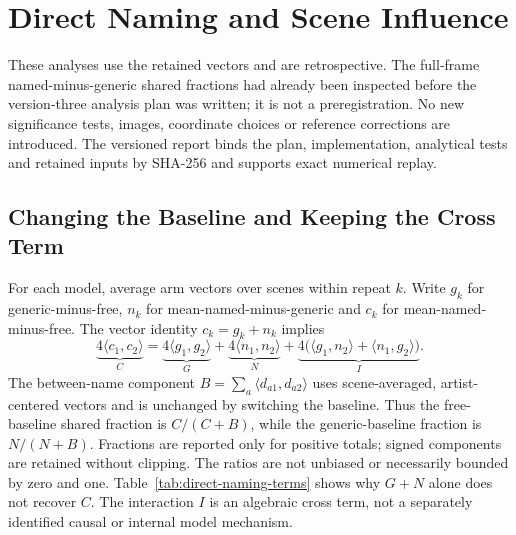 \section{Direct Naming and Scene Influence}\label{app:direct-naming}
These analyses use the retained vectors and are retrospective. The full-frame
named-minus-generic shared fractions had already been inspected before the
version-three analysis plan was written; it is not a preregistration.
No new significance tests, images, coordinate choices or reference corrections
are introduced. The versioned report binds the plan, implementation, analytical
tests and retained inputs by SHA-256 and supports exact numerical replay.

\subsection{Changing the Baseline and Keeping the Cross Term}
For each model, average arm vectors over scenes within repeat $k$. Write $g_k$
for generic-minus-free, $n_k$ for mean-named-minus-generic and $c_k$ for
mean-named-minus-free. The vector identity $c_k=g_k+n_k$ implies
\begin{equation}
 \underbrace{4\langle c_1,c_2\rangle}_{C}
 =\underbrace{4\langle g_1,g_2\rangle}_{G}
 +\underbrace{4\langle n_1,n_2\rangle}_{N}
 +\underbrace{4\bigl(\langle g_1,n_2\rangle+
                    \langle n_1,g_2\rangle\bigr)}_{I}.
 \label{eq:generic-naming-identity}
\end{equation}
The between-name component $B=\sum_a\langle d_{a1},d_{a2}\rangle$ uses
scene-averaged, artist-centered vectors and is unchanged by switching the
baseline. Thus the free-baseline shared fraction is $C/(C+B)$, while the
generic-baseline fraction is $N/(N+B)$. Fractions are reported only for positive
totals; signed components are retained without clipping. The ratios are not
unbiased or necessarily bounded by zero and one. Table~\ref{tab:direct-naming-terms}
shows why $G+N$ alone does not recover $C$. The interaction $I$ is an algebraic
cross term, not a separately identified causal or internal model mechanism.

